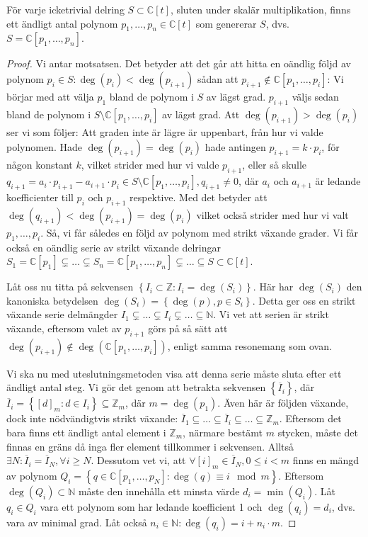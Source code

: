 \begin{Theorem}
\label{FinitelyGenerated}
För varje icketrivial delring $S \subset \mathbb{C}[t]$, sluten under skalär multiplikation, finns ett ändligt antal polynom $p_1,\ldots,p_n \in \mathbb{C}[t]$ som genererar $S$, dvs. $S=\mathbb{C}[p_1,\ldots,p_n]$.
\end{Theorem}

\begin{proof}
Vi antar motsatsen. Det betyder att det går att hitta en oändlig följd av polynom $p_i\in S:\deg(p_i)<\deg(p_{i+1})$ sådan att $p_{i+1} \notin \mathbb{C}[p_1,\ldots,p_i]$: Vi börjar med att välja $p_1$ bland de polynom i $S$ av lägst grad. $p_{i+1}$ väljs sedan bland de polynom i $S \setminus \mathbb{C}[p_1,\ldots,p_i]$ av lägst grad. Att $\deg(p_{i+1})>\deg(p_i)$ ser vi som följer: Att graden inte är lägre är uppenbart, från hur vi valde polynomen. Hade $\deg(p_{i+1})=\deg(p_i)$ hade antingen $p_{i+1}=k\cdot p_i$, för någon konstant $k$, vilket strider med hur vi valde $p_{i+1}$, eller så skulle $q_{i+1}=a_i\cdot p_{i+1}-a_{i+1}\cdot p_i \in S\setminus\mathbb{C}[p_1,\ldots,p_i], q_{i+1} \neq 0$, där $a_i$ och $a_{i+1}$ är ledande koefficienter till $p_i$ och $p_{i+1}$ respektive. Med det betyder att $\deg(q_{i+1})<\deg(p_{i+1})=\deg(p_i)$ vilket också strider med hur vi valt $p_1,\ldots,p_i$. Så, vi får således en följd av polynom med strikt växande grader. Vi får också en oändlig serie av strikt växande delringar $S_1=\mathbb{C}[p_1] \subsetneq \ldots \subsetneq S_n=\mathbb{C}[p_1,\ldots,p_n] \subsetneq \ldots \subseteq S \subset \mathbb{C}[t]$.

Låt oss nu titta på sekvensen $\left\{I_i \subset \mathbb{Z}: I_i=\deg(S_i)\right\}$. Här har $\deg(S_i)$ den kanoniska betydelsen $\deg(S_i)=\left\{\deg(p), p \in S_i\right\}$. Detta ger oss en strikt växande serie delmängder $I_1 \subsetneq \ldots \subsetneq I_i \subsetneq \ldots \subseteq \mathbb{N}$. Vi vet att serien är strikt växande, eftersom valet av $p_{i+1}$ görs på så sätt att $\deg(p_{i+1})\notin \deg(\mathbb{C}[p_1,\ldots,p_i])$, enligt samma resonemang som ovan.

Vi ska nu med uteslutningsmetoden visa att denna serie måste sluta efter ett ändligt antal steg. Vi gör det genom att betrakta sekvensen $\left\{\overline{I}_i\right\}$, där $\overline{I}_i=\left\{[d]_m:d\in I_i \right\} \subseteq \mathbb{Z}_m$, där $m=\deg(p_1)$. Även här är följden växande, dock inte nödvändigtvis strikt växande: $\overline{I}_1 \subseteq \ldots \subseteq \overline{I}_i \subseteq \ldots \subseteq \mathbb{Z}_m$. Eftersom det bara finns ett ändligt antal element i $\mathbb{Z}_m$, närmare bestämt $m$ stycken, måste det finnas en gräns då inga fler element tillkommer i sekvensen. Alltså $\exists N : \overline{I}_i = \overline{I}_N, \forall i \geq N$. Dessutom vet vi, att $\forall [i]_m \in \overline{I}_N, 0 \leq i < m$ finns en mängd av polynom $Q_i=\left\{q \in \mathbb{C}[p_1,\ldots,p_N] : \deg(q) \equiv i \mod{m}\right\}$. Eftersom $\deg(Q_i) \subset \mathbb{N}$ måste den innehålla ett minsta värde $d_i=\min(Q_i)$. Låt $q_i \in Q_i$ vara ett polynom som har ledande koefficient 1 och $\deg(q_i)=d_i$, dvs. vara av minimal grad. Låt också $n_i \in \mathbb{N} : \deg(q_i) = i + n_i \cdot m$.


\end{proof}

